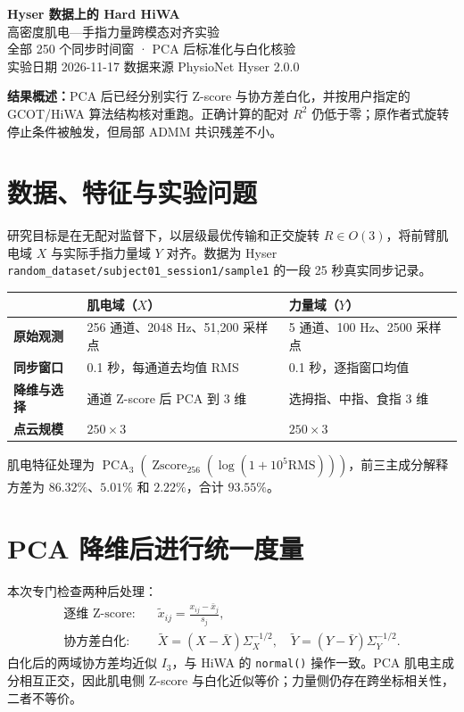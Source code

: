 \documentclass[UTF8,fontset=none,11pt,a4paper]{ctexart}
\begin{document}
\begin{center}
{\Huge\bfseries Hyser 数据上的 Hard HiWA}\\[5pt]
{\Large\color{accent} 高密度肌电—手指力量跨模态对齐实验}\\[9pt]
{\large 全部 250 个同步时间窗 · PCA 后标准化与白化核验}\\[6pt]
{\small 实验日期 2026-11-17 \quad 数据来源 PhysioNet Hyser 2.0.0}
\end{center}
\noindent\colorbox{faint}{\parbox{\dimexpr\textwidth-2\fboxsep}{\small
\textbf{结果概述：}PCA 后已经分别实行 Z-score 与协方差白化，并按用户指定的 GCOT/HiWA 算法结构核对重跑。正确计算的配对 $R^2$ 仍低于零；原作者式旋转停止条件被触发，但局部 ADMM 共识残差不小。}}

\section{数据、特征与实验问题}
研究目标是在无配对监督下，以层级最优传输和正交旋转 $R\in O(3)$，将前臂肌电域 $X$ 与实际手指力量域 $Y$ 对齐。数据为 Hyser \texttt{random\_dataset/subject01\_session1/sample1} 的一段 25 秒真实同步记录。
\begin{center}
\begin{tabularx}{\textwidth}{>{\bfseries}l X X}
\toprule
 & 肌电域（$X$） & 力量域（$Y$）\\
\midrule
原始观测 & 256 通道、2048 Hz、51,200 采样点 & 5 通道、100 Hz、2500 采样点\\
同步窗口 & 0.1 秒，每通道去均值 RMS & 0.1 秒，逐指窗口均值\\
降维与选择 & 通道 Z-score 后 PCA 到 3 维 & 选拇指、中指、食指 3 维\\
点云规模 & $250\times3$ & $250\times3$\\
\bottomrule
\end{tabularx}
\end{center}
肌电特征处理为 $\operatorname{PCA}_3(\operatorname{Zscore}_{256}(\log(1+10^5\mathrm{RMS})))$，前三主成分解释方差为 $86.32\%$、$5.01\%$ 和 $2.22\%$，合计 \textbf{$93.55\%$}。

\section{PCA 降维后进行统一度量}
本次专门检查两种后处理：
\begin{align}
\text{逐维 Z-score:}\quad &\widetilde x_{ij}=\frac{x_{ij}-\bar x_j}{s_j},\\
\text{协方差白化:}\quad &\widetilde X=(X-\bar X)\Sigma_X^{-1/2},\quad
\widetilde Y=(Y-\bar Y)\Sigma_Y^{-1/2}.
\end{align}
白化后的两域协方差均近似 $I_3$，与 HiWA 的 \texttt{normal()} 操作一致。PCA 肌电主成分相互正交，因此肌电侧 Z-score 与白化近似等价；力量侧仍存在跨坐标相关性，二者不等价。
\end{document}
